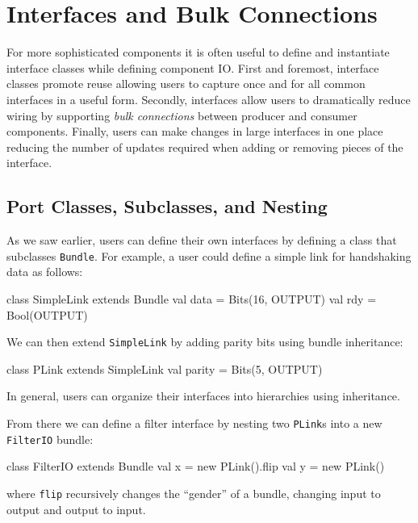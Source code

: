 \documentclass[twocolumn,10pt]{article}
\begin{document}
\section{Interfaces and Bulk Connections}
\label{sec:interfaces}

For more sophisticated components it is often useful to define and
instantiate interface classes while defining component IO.  First and
foremost, interface classes promote reuse allowing users to capture
once and for all common interfaces in a useful form.  Secondly,
interfaces allow users to dramatically reduce wiring by supporting
{\em bulk connections} between producer and consumer components.  Finally,
users can make changes in large interfaces in one place reducing the
number of updates required when adding or removing pieces of the
interface.

\subsection{Port Classes, Subclasses, and Nesting}

As we saw earlier, users can define their own interfaces by defining a class that subclasses \verb+Bundle+.  
For example, a user could define a simple link for handshaking data as follows:

\begin{scala}
class SimpleLink extends Bundle { 
  val data = Bits(16, OUTPUT) 
  val rdy  = Bool(OUTPUT)
}
\end{scala}

\noindent
We can then extend \verb+SimpleLink+ by adding parity bits using
bundle inheritance:

\begin{scala}
class PLink extends SimpleLink { 
  val parity = Bits(5, OUTPUT) 
}
\end{scala}

\noindent
In general, users can organize their interfaces into hierarchies using inheritance.  

From there we can define a filter interface by nesting two
\verb+PLink+s into a new \verb+FilterIO+ bundle:

\begin{scala}
class FilterIO extends Bundle { 
  val x = new PLink().flip
  val y = new PLink()
}
\end{scala}

\noindent
where \verb+flip+ recursively changes the ``gender'' of a bundle,
changing input to output and output to input.
\end{document}
